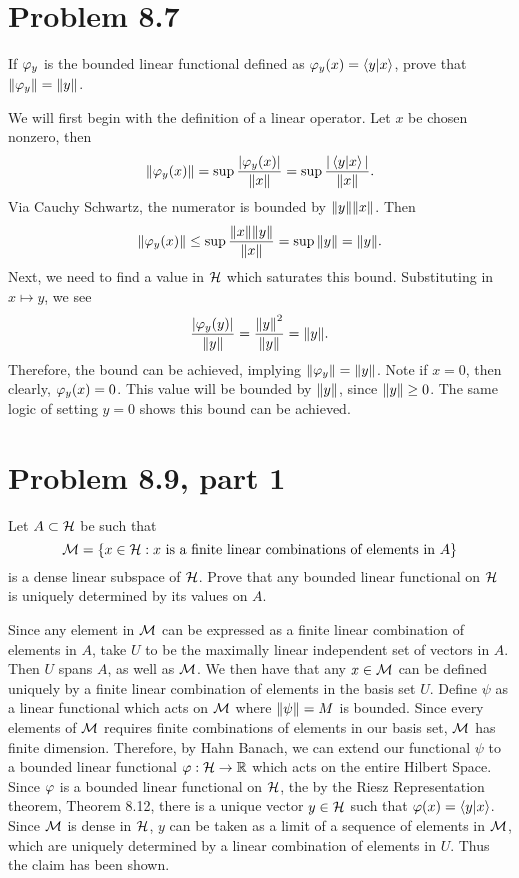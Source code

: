 \newpage
\section{Problem 8.7}
If $\varphi_y$ is the bounded linear functional defined as $\varphi_y (x) = \braket{y}{x}$, prove that $\norm{\varphi_y} = \norm{y}$.
\partbreak
\begin{solution}
    We will first begin with the definition of a linear operator. Let $x$ be chosen nonzero, then 
    \[\norm{\varphi_y(x)} = \sup\frac{|\varphi_y(x)|}{\norm{x}} = \sup\frac{|\braket{y}{x}|}{\norm{x}}.\]
    Via Cauchy Schwartz, the numerator is bounded by $\norm{y}\norm{x}$. Then
    \[\norm{\varphi_y(x)} \leq \sup\frac{\norm{x}\norm{y}}{\norm{x}} = \sup\norm{y} = \norm{y}.\]
    Next, we need to find a value in $\mathcal{H}$ which saturates this bound. Substituting in $x \mapsto y$, we see
    \[\frac{|\varphi_y(y)|}{\norm{y}} = \frac{\norm{y}^2}{\norm{y}} = \norm{y}.\]
    Therefore, the bound can be achieved, implying $\norm{\varphi_y} = \norm{y}$. Note if $x = 0$, then clearly, $\varphi_y(x) = 0$. This value will be bounded by $\norm{y}$, since $\norm{y}\geq 0$. The same logic of setting $y = 0$ shows this bound can be achieved.  
\end{solution}

\newpage
\section{Problem 8.9, part 1}
Let $A \subset \mathcal{H}$ be such that
\[\mathcal{M} = \{ x \in \mathcal{H} : x \text{ is a finite linear combinations of elements in $A$}\}\]
is a dense linear subspace of $\mathcal{H}$. Prove that any bounded linear functional on $\mathcal{H}$ is uniquely determined by its values on $A$. 
\partbreak
\begin{solution}

    Since any element in $\mathcal{M}$ can be expressed as a finite linear combination of elements in $A$, take $U$ to be the maximally linear independent set of vectors in $A$. Then $U$ spans $A$, as well as $\mathcal{M}$. We then have that any $x \in \mathcal{M}$ can be defined uniquely by a finite linear combination of elements in the basis set $U$. Define $\psi$ as a linear functional which acts on $\mathcal{M}$ where $\norm{\psi} = M$ is bounded. Since every elements of $\mathcal{M}$ requires finite combinations of elements in our basis set, $\mathcal{M}$ has finite dimension. Therefore, by Hahn Banach, we can extend our functional $\psi$ to a bounded linear functional $\varphi : \mathcal{H} \rightarrow \mathbb{R}$ which acts on the entire Hilbert Space. Since $\varphi$ is a bounded linear functional on $\mathcal{H}$, the by the Riesz Representation theorem, Theorem 8.12, there is a unique vector $y \in \mathcal{H}$ such that $\varphi(x) = \braket{y}{x}$. Since $\mathcal{M}$ is dense in $\mathcal{H}$, $y$ can be taken as a limit of a sequence of elements in $\mathcal{M}$, which are uniquely determined by a linear combination of elements in $U$. Thus the claim has been shown. 

\end{solution}

